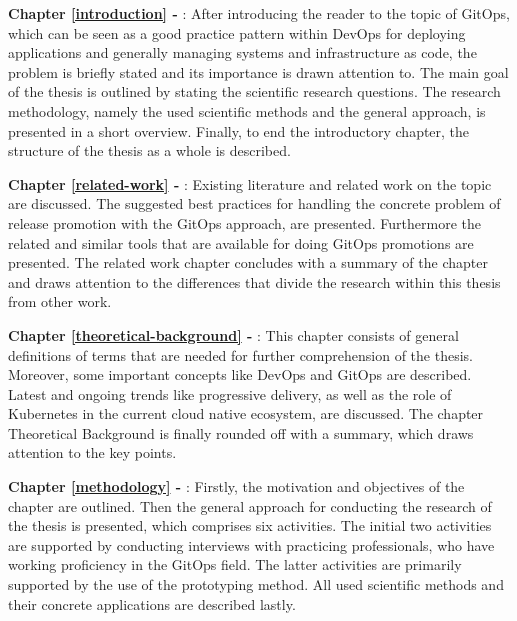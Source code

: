 \textbf{Chapter \ref{introduction} - }:
After introducing the reader to the topic of GitOps, which can be seen as a good practice pattern within DevOps for deploying applications and generally managing systems and infrastructure as code,
the problem is briefly stated and its importance is drawn attention to.
The main goal of the thesis is outlined by stating the scientific research questions.
The research methodology, namely the used scientific methods and the general approach, is presented in a short overview.
Finally, to end the introductory chapter, the structure of the thesis as a whole is described.

\textbf{Chapter \ref{related-work} - }:
Existing literature and related work on the topic are discussed.
The suggested best practices for handling the concrete problem of release promotion with the GitOps approach,
are presented.
Furthermore the related and similar tools that are available for doing GitOps promotions are presented.
The related work chapter concludes with a summary of the chapter and draws attention to the differences
that divide the research within this thesis from other work.

\textbf{Chapter \ref{theoretical-background} - }:
This chapter consists of general definitions of terms that are needed for further comprehension of the thesis.
Moreover, some important concepts like DevOps and GitOps are described.
Latest and ongoing trends like progressive delivery, as well as
the role of Kubernetes in the current cloud native ecosystem,
are discussed.
The chapter Theoretical Background is finally rounded off with a summary,
which draws attention to the key points.

\textbf{Chapter \ref{methodology} - }:
Firstly, the motivation and objectives of the chapter are outlined.
Then the general approach for conducting the research of the thesis is presented,
which comprises six activities. The initial two activities are supported by conducting interviews
with practicing professionals, who have working proficiency in the GitOps field.
The latter activities are primarily supported by the use of the prototyping method.
All used scientific methods and their concrete applications are described lastly.

